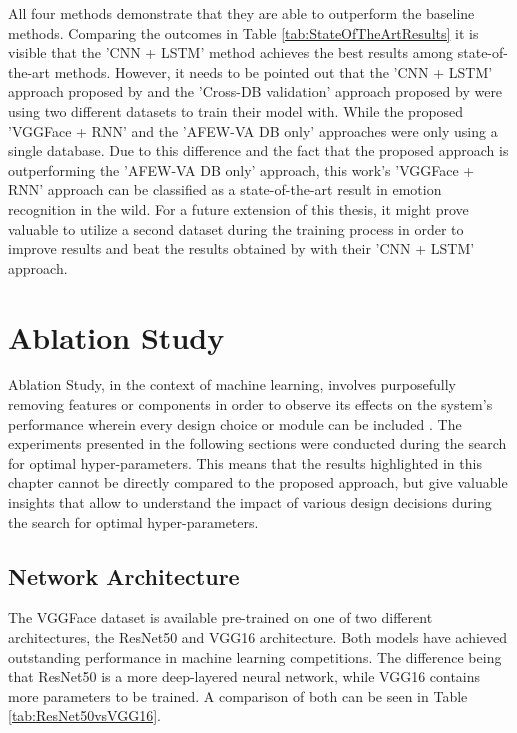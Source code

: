 All four methods demonstrate that they are able to outperform the baseline methods. Comparing the outcomes in Table \ref{tab:StateOfTheArtResults} it is visible that the 'CNN + LSTM' method achieves the best results among state-of-the-art methods. 
\newline\newline
However, it needs to be pointed out that the 'CNN + LSTM' approach proposed by \citet{Theagarajan:2018:DeepDriver} and the 'Cross-DB validation' approach proposed by \citet{Handrich:2020:SimultaneousPredVA} were using two different datasets to train their model with. While the proposed 'VGGFace + RNN' and the 'AFEW-VA DB only' approaches were only using a single database. Due to this difference and the fact that the proposed approach is outperforming the 'AFEW-VA DB only' approach, this work's 'VGGFace + RNN' approach can be classified as a state-of-the-art result in emotion recognition in the wild.
\newline\newline
For a future extension of this thesis, it might prove valuable to utilize a second dataset during the training process in order to improve results and beat the results obtained by \citet{Theagarajan:2018:DeepDriver} with their 'CNN + LSTM' approach.


\section{Ablation Study}
Ablation Study, in the context of machine learning, involves purposefully removing features or components in order to observe its effects on the system's performance wherein every design choice or module can be included \citep{Lillian:2018:AblationOfARobotsBrain}.
\newline\newline
The experiments presented in the following sections were conducted during the search for optimal hyper-parameters. This means that the results highlighted in this chapter cannot be directly compared to the proposed approach, but give valuable insights that allow to understand the impact of various design decisions during the search for optimal hyper-parameters.

\subsection{Network Architecture}
The VGGFace dataset is available pre-trained on one of two different architectures, the ResNet50 and VGG16 architecture. Both models have achieved outstanding performance in machine learning competitions. The difference being that ResNet50 is a more deep-layered neural network, while VGG16 contains more parameters to be trained. A comparison of both can be seen in Table \ref{tab:ResNet50vsVGG16}.

